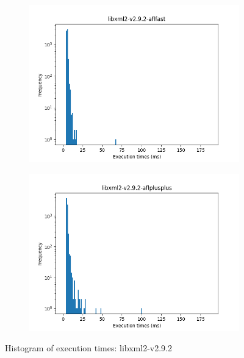 \begin{figure}
\begin{subfigure}[t]{0.475\textwidth}
        \centering
        \includegraphics[width=\textwidth]{Experiments/execs/libxml2-v2.9.2-aflfast.png}
        \caption{}
        \label{fig:sub:libxml2-hist-aflfast}
    \end{subfigure}
    \hfill
    \begin{subfigure}[t]{0.475\textwidth}
        \centering
        \includegraphics[width=\textwidth]{Experiments/execs/libxml2-v2.9.2-aflplusplus.png}
        \caption{}
        \label{fig:sub:libxml2-hist-aflplusplus}
    \end{subfigure}

    \caption{Histogram of execution times: libxml2-v2.9.2}
    \label{fig:exe-libxml2}
\end{figure}

